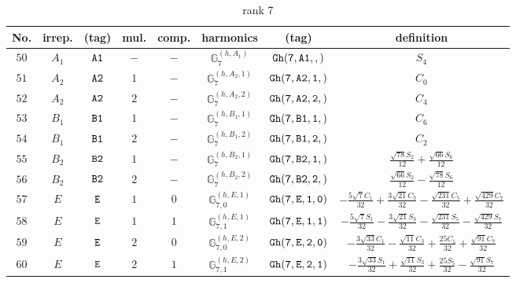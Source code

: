 \documentclass[fleqn,8pt]{jsarticle}
\begin{document}
\begin{table}[ht!]
\begin{center}
\caption{rank 7}
\renewcommand{\arraystretch}{1.3}
\begin{tabular}{cccccccc} \hline \hline
No. & irrep. & (tag) & mul. & comp. & harmonics & (tag) & definition \\ \hline
$ 50 $ & $ A_{1} $ & $ {\tt A1} $ & $ - $ & $ - $ & $ \mathbb{G}_{7}^{(h,A_{1})} $ & $ {\tt Gh(7,A1,,)} $ & $ S_{4} $ \\
$ 51 $ & $ A_{2} $ & $ {\tt A2} $ & $ 1 $ & $ - $ & $ \mathbb{G}_{7}^{(h,A_{2},1)} $ & $ {\tt Gh(7,A2,1,)} $ & $ C_{0} $ \\
$ 52 $ & $ A_{2} $ & $ {\tt A2} $ & $ 2 $ & $ - $ & $ \mathbb{G}_{7}^{(h,A_{2},2)} $ & $ {\tt Gh(7,A2,2,)} $ & $ C_{4} $ \\
$ 53 $ & $ B_{1} $ & $ {\tt B1} $ & $ 1 $ & $ - $ & $ \mathbb{G}_{7}^{(h,B_{1},1)} $ & $ {\tt Gh(7,B1,1,)} $ & $ C_{6} $ \\
$ 54 $ & $ B_{1} $ & $ {\tt B1} $ & $ 2 $ & $ - $ & $ \mathbb{G}_{7}^{(h,B_{1},2)} $ & $ {\tt Gh(7,B1,2,)} $ & $ C_{2} $ \\
$ 55 $ & $ B_{2} $ & $ {\tt B2} $ & $ 1 $ & $ - $ & $ \mathbb{G}_{7}^{(h,B_{2},1)} $ & $ {\tt Gh(7,B2,1,)} $ & $ \frac{\sqrt{78} S_{2}}{12} + \frac{\sqrt{66} S_{6}}{12} $ \\
$ 56 $ & $ B_{2} $ & $ {\tt B2} $ & $ 2 $ & $ - $ & $ \mathbb{G}_{7}^{(h,B_{2},2)} $ & $ {\tt Gh(7,B2,2,)} $ & $ \frac{\sqrt{66} S_{2}}{12} - \frac{\sqrt{78} S_{6}}{12} $ \\
$ 57 $ & $ E $ & $ {\tt E} $ & $ 1 $ & $ 0 $ & $ \mathbb{G}_{7,0}^{(h,E,1)} $ & $ {\tt Gh(7,E,1,0)} $ & $ - \frac{5 \sqrt{7} C_{1}}{32} + \frac{3 \sqrt{21} C_{3}}{32} - \frac{\sqrt{231} C_{5}}{32} + \frac{\sqrt{429} C_{7}}{32} $ \\
$ 58 $ & $ E $ & $ {\tt E} $ & $ 1 $ & $ 1 $ & $ \mathbb{G}_{7,1}^{(h,E,1)} $ & $ {\tt Gh(7,E,1,1)} $ & $ - \frac{5 \sqrt{7} S_{1}}{32} - \frac{3 \sqrt{21} S_{3}}{32} - \frac{\sqrt{231} S_{5}}{32} - \frac{\sqrt{429} S_{7}}{32} $ \\
$ 59 $ & $ E $ & $ {\tt E} $ & $ 2 $ & $ 0 $ & $ \mathbb{G}_{7,0}^{(h,E,2)} $ & $ {\tt Gh(7,E,2,0)} $ & $ - \frac{3 \sqrt{33} C_{1}}{32} - \frac{\sqrt{11} C_{3}}{32} + \frac{25 C_{5}}{32} + \frac{\sqrt{91} C_{7}}{32} $ \\
$ 60 $ & $ E $ & $ {\tt E} $ & $ 2 $ & $ 1 $ & $ \mathbb{G}_{7,1}^{(h,E,2)} $ & $ {\tt Gh(7,E,2,1)} $ & $ - \frac{3 \sqrt{33} S_{1}}{32} + \frac{\sqrt{11} S_{3}}{32} + \frac{25 S_{5}}{32} - \frac{\sqrt{91} S_{7}}{32} $ \\

\end{tabular}
\end{center}
\end{table}
\end{document}
